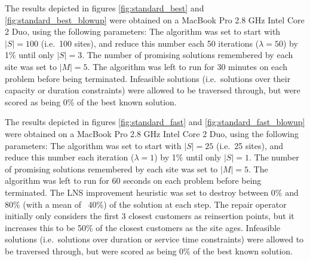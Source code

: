 
The results depicted in figures \ref{fig:standard_best} and \ref{fig:standard_best_blowup} were obtained on a MacBook Pro 2.8 GHz Intel Core 2 Duo, using the following parameters: The algorithm was set to start with $|S| = 100$ (i.e.~100 sites), and reduce this number each 50 iterations ($\lambda = 50$) by 1\% until only $|S| = 3$. The number of promising solutions remembered by each site was set to $|M| = 5$. The algorithm was left to run for 30 minutes on each problem before being terminated. Infeasible solutions (i.e.~solutions over their capacity or duration constraints) were allowed to be traversed through, but were scored as being 0\% of the best known solution.




The results depicted in figures \ref{fig:standard_fast} and \ref{fig:standard_fast_blowup} were obtained on a MacBook Pro 2.8 GHz Intel Core 2 Duo, using the following parameters: The algorithm was set to start with $|S| = 25$ (i.e.~25 sites), and reduce this number each iteration ($\lambda = 1$) by 1\% until only $|S| = 1$. The number of promising solutions remembered by each site was set to $|M| = 5$. The algorithm was left to run for 60 seconds on each problem before being terminated. The LNS improvement heuristic was set to destroy between 0\% and 80\% (with a mean of ~40\%) of the solution at each step. The repair operator initially only considers the first 3 closest customers as reinsertion points, but it increases this to be 50\% of the closest customers as the site ages. Infeasible solutions (i.e.~solutions over duration or service time constraints) were allowed to be traversed through, but were scored as being 0\% of the best known solution.

